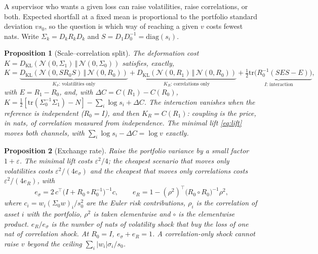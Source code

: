 \documentclass[12pt]{article}
\newtheorem{proposition}{Proposition}
\theoremstyle{definition}
\theoremstyle{remark}
\newcommand{\KL}[2]{D_{\mathrm{KL}}\!\left(#1\,\Vert\,#2\right)}
\begin{document}
\begin{doublespace}
A supervisor who wants a given loss can raise volatilities, raise
correlations, or both. Expected shortfall at a fixed mean is proportional to
the portfolio standard deviation $vs_0$, so the question is which way of
reaching a given $v$ costs fewest nats. Write $\Sigma_k=D_kR_kD_k$ and
$S=D_1D_0^{-1}=\mathrm{diag}(s_i)$.

\begin{proposition}[Scale--correlation split]
\label{prop:split}
The deformation cost $K=\KL{\mathcal N(0,\Sigma_1)}{\mathcal N(0,\Sigma_0)}$
satisfies, exactly,
\begin{equation}
\label{eq:split}
K=\underbrace{\KL{\mathcal N(0,SR_0S)}{\mathcal N(0,R_0)}}_{K_\sigma\text{: volatilities only}}
+\underbrace{\KL{\mathcal N(0,R_1)}{\mathcal N(0,R_0)}}_{K_R\text{: correlations only}}
+\underbrace{\tfrac12\mathrm{tr}\bigl(R_0^{-1}(SES-E)\bigr)}_{I\text{: interaction}},
\end{equation}
with $E=R_1-R_0$, and, with $\Delta C=C(R_1)-C(R_0)$,
$K=\tfrac12[\mathrm{tr}(\Sigma_0^{-1}\Sigma_1)-N]-\sum_i\log s_i+\Delta C$.
The interaction vanishes when the reference is independent ($R_0=I$), and
then $K_R=C(R_1)$: coupling is the price, in nats, of correlation measured
from independence. The minimal lift \eqref{eq:lift} moves both channels, with
$\sum_i\log s_i-\Delta C=\log v$ exactly.
\end{proposition}

\begin{proposition}[Exchange rate]
\label{prop:rate}
Raise the portfolio variance by a small factor $1+\varepsilon$. The minimal
lift costs $\varepsilon^2/4$; the cheapest scenario that moves only
volatilities costs $\varepsilon^2/(4e_\sigma)$ and the cheapest that moves only
correlations costs $\varepsilon^2/(4e_R)$, with
\begin{equation}
\label{eq:rate}
e_\sigma=2\,c^\top\bigl(I+R_0\circ R_0^{-1}\bigr)^{-1}c,\qquad
e_R=1-(\rho^{2})^\top\bigl(R_0\circ R_0\bigr)^{-1}\rho^{2},
\end{equation}
where $c_i=w_i(\Sigma_0w)_i/s_0^2$ are the Euler risk contributions, $\rho_i$
is the correlation of asset $i$ with the portfolio, $\rho^2$ is taken
elementwise and $\circ$ is the elementwise product. $e_R/e_\sigma$ is the
number of nats of volatility shock that buy the loss of one nat of
correlation shock. At $R_0=I$, $e_\sigma+e_R=1$. A correlation-only shock
cannot raise $v$ beyond the ceiling $\sum_i|w_i|\sigma_i/s_0$.
\end{proposition}


\end{doublespace}
\end{document}
